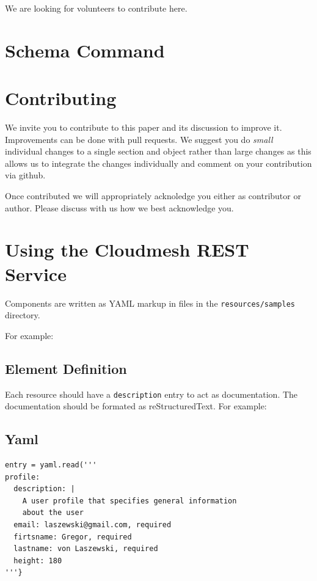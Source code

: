 \documentclass[9pt,twocolumn,twoside]{styles/osajnl}
\begin{document}
We are looking for volunteers to contribute here.

\newpage

\appendix

\section{Schema Command}



\section{Contributing}

We invite you to contribute to this paper and its discussion to
improve it. Improvements can be done with pull requests. We suggest
you do {\em small} individual changes to a single section and object
rather than large changes as this allows us to integrate the changes
individually and comment on your contribution via github.

Once contributed we will appropriately acknoledge you either as
contributor or author. Please discuss with us how we best acknowledge
you.

\section{Using the Cloudmesh REST Service} 

Components are written as YAML markup in files in the
\verb+resources/samples+ directory.

For example:


\subsection{Element Definition}

Each resource should have a \verb+description+ entry to act as
documentation. The documentation should be formated as
reStructuredText. For example:

\subsection{Yaml}

\begin{Verbatim}
entry = yaml.read('''
profile:
  description: |
    A user profile that specifies general information 
    about the user
  email: laszewski@gmail.com, required
  firtsname: Gregor, required
  lastname: von Laszewski, required
  height: 180
'''}
\end{Verbatim}
\end{document}
